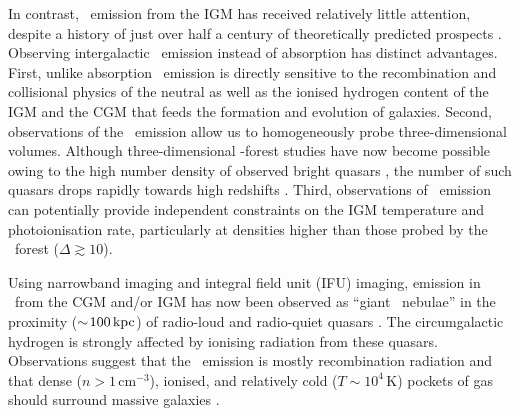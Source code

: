 In contrast, \lya\ emission from the IGM has received relatively little attention, despite a history of just over half a century of theoretically predicted prospects \citep{1967ApJ...147..868P, 1987MNRAS.225P...1H, 1996ApJ...468..462G, 2001ApJ...562..605F, 2003ApJ...599L...1F, 2005ApJ...622....7F, 2005ApJ...628...61C, 2010ApJ...708.1048K, 2010ApJ...725..633F, 2012MNRAS.423..344R, 2013ApJ...763..132S, 2016MNRAS.462.1961S, 2017ApJ...848...52H, 2019MNRAS.489.2417A, 2020MNRAS.494.5439E}. Observing intergalactic \lya\ emission instead of absorption has distinct advantages. First, unlike absorption \lya\ emission is directly sensitive to the recombination and collisional physics of the neutral as well as the ionised hydrogen content of the IGM and the CGM that feeds the formation and evolution of galaxies. Second, observations of the \lya\ emission allow us to homogeneously probe three-dimensional volumes. Although three-dimensional \lya-forest studies have now become possible owing to the high number density of observed bright quasars \citep[see e.g.][]{2014MNRAS.440.2599C}, the number of such quasars drops rapidly towards high redshifts \citep{2019MNRAS.488.1035K}. Third, observations of \lya\ emission can potentially provide independent constraints on the IGM temperature and photoionisation rate, particularly at densities higher than those probed by the \lya\ forest ($\Delta \gtrsim 10$).

Using narrowband imaging and integral field unit (IFU) imaging, emission in \lya\ from the CGM and/or IGM has now been observed as ``giant \lya\ nebulae'' in the proximity ($\sim \! 100\,\mathrm{kpc}$) of radio-loud and radio-quiet quasars \citep{1985ApJ...299L...1D, 1991ApJ...368...28H, 1991ApJ...370...78H, 1990ApJ...365..487M, 2007A&A...461..823V, 2007MNRAS.378..416V, 2008ApJ...672...48C, 2008MNRAS.390.1505H, 2008ApJ...681..856R, 2009A&A...495..471S, 2011MNRAS.418.1115R, 2012MNRAS.425.1992C, 2013MNRAS.429..429R, 2014Natur.506...63C, 2014ApJ...786..106M, 2014MNRAS.443.3795R, 2015Sci...348..779H, 2016ApJ...829....3A, 2016ApJ...831...39B, 2016MNRAS.462.1978F, 2017ASSL..430..195C}. The circumgalactic hydrogen is strongly affected by ionising radiation from these quasars. Observations suggest that the \lya\ emission is mostly recombination radiation and that dense ($n > 1 \, \mathrm{cm^{-3}}$), ionised, and relatively cold ($T \sim 10^4 \, \mathrm{K}$) pockets of gas should surround massive galaxies \citep{2017ASSL..430..195C}.

